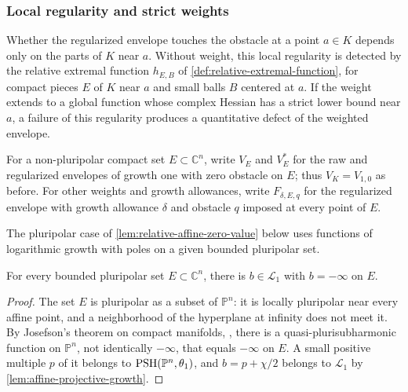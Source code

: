 \subsubsection{Local regularity and strict weights}
\label{sec:affine-local-regularity}

Whether the regularized envelope touches the obstacle at a point $a\in K$ depends only on the parts of $K$ near $a$. Without weight, this local regularity is detected by the relative extremal function $h_{E,B}$ of \cref{def:relative-extremal-function}, for compact pieces $E$ of $K$ near $a$ and small balls $B$ centered at $a$. If the weight extends to a global function whose complex Hessian has a strict lower bound near $a$, a failure of this regularity produces a quantitative defect of the weighted envelope.

For a non-pluripolar compact set $E\subset\mathbb C^n$, write $V_E$ and $V_E^*$ for the raw and regularized envelopes of growth one with zero obstacle on $E$; thus $V_K=V_{1,0}$ as before. For other weights and growth allowances, write $F_{\delta,E,q}$ for the regularized envelope with growth allowance $\delta$ and obstacle $q$ imposed at every point of $E$.

The pluripolar case of \cref{lem:relative-affine-zero-value} below uses functions of logarithmic growth with poles on a given bounded pluripolar set.

\begin{lemma}\label{lem:affine-logarithmic-pole-barrier}
For every bounded pluripolar set $E\subset\mathbb C^n$, there is $b\in\mathcal L_1$ with $b=-\infty$ on $E$.
\end{lemma}
\begin{proof}
The set $E$ is pluripolar as a subset of $\mathbb P^n$: it is locally pluripolar near every affine point, and a neighborhood of the hyperplane at infinity does not meet it. By Josefson's theorem on compact manifolds, \cite[Theorem~1.1.5]{SGPT}, there is a quasi-plurisubharmonic function on $\mathbb P^n$, not identically $-\infty$, that equals $-\infty$ on $E$. A small positive multiple $p$ of it belongs to $\mathrm{PSH}(\mathbb P^n,\theta_1)$, and $b=p+\chi/2$ belongs to $\mathcal L_1$ by \cref{lem:affine-projective-growth}.
\end{proof}

